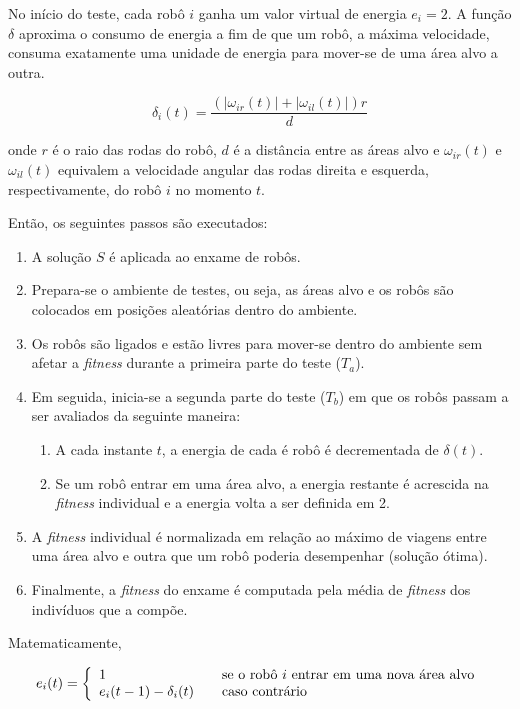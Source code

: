 No início do teste, cada robô $i$ ganha um valor virtual de energia $e_{i} = 2$. A função $\delta$ aproxima o consumo de energia a fim de que um robô, a máxima velocidade, consuma exatamente uma unidade de energia para mover-se de uma área alvo a outra.

$$
\delta_{i} (t) = \frac{( | \omega_{ir} (t) | + | \omega_{il} (t) |) r}{d}
$$

onde $r$ é o raio das rodas do robô, $d$ é a distância entre as áreas alvo e $\omega_{ir} (t)$ e $\omega_{il} (t)$ equivalem a velocidade angular das rodas direita e esquerda, respectivamente, do robô $i$ no momento $t$.

Então, os seguintes passos são executados:

\begin{enumerate}
    \item A solução $S$ é aplicada ao enxame de robôs.
    \item Prepara-se o ambiente de testes, ou seja, as áreas alvo e os robôs são colocados em posições aleatórias dentro do ambiente.
    \item Os robôs são ligados e estão livres para mover-se dentro do ambiente sem afetar a \textit{fitness} durante a primeira parte do teste ($T_{a}$).
    \item Em seguida, inicia-se a segunda parte do teste ($T_{b}$) em que os robôs passam a ser avaliados da seguinte maneira:
    \begin{enumerate}
        \item A cada instante $t$, a energia de cada é robô é decrementada de $\delta (t)$.
        \item Se um robô entrar em uma área alvo, a energia restante é acrescida na \textit{fitness} individual e a energia volta a ser definida em 2.
    \end{enumerate}
    \item A \textit{fitness} individual é normalizada em relação ao máximo de viagens entre uma área alvo e outra que um robô poderia desempenhar (solução ótima).
    \item Finalmente, a \textit{fitness} do enxame é computada pela média de \textit{fitness} dos indivíduos que a compõe.
\end{enumerate}

Matematicamente,

$$
e_{i} (t) = \left\{
\begin{array}{l l}
1 & \quad \text{se o robô $i$ entrar em uma nova área alvo}\\
e_{i}(t - 1) - \delta_{i} (t) & \quad \text{caso contrário}
\end{array} \right.
$$


